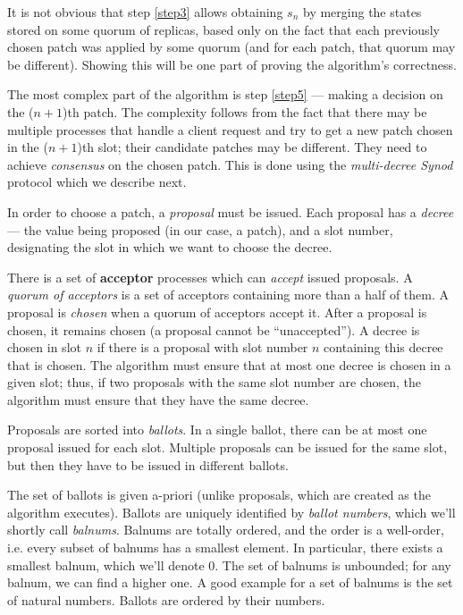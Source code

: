 \documentclass[12pt,a4paper,en]{pracamgr}
\newcommand{\tb}[1]{\textbf{#1}}
\newcommand{\ti}[1]{\textit{#1}}
\begin{document}
It is not obvious that step \ref{step3} allows obtaining $s_n$ by merging the states stored on some quorum of replicas, based only on the fact that each previously chosen patch was applied by some quorum (and for each patch, that quorum may be different). Showing this will be one part of proving the algorithm's correctness.

The most complex part of the algorithm is step \ref{step5} --- making a decision on the ($n+1$)th patch. The complexity follows from the fact that there may be multiple processes that handle a client request and try to get a new patch chosen in the ($n+1$)th slot; their candidate patches may be different. They need to achieve \ti{consensus} on the chosen patch. This is done using the \ti{multi-decree Synod} protocol which we describe next.

In order to choose a patch, a \ti{proposal} must be issued. Each proposal has a \ti{decree} --- the value being proposed (in our case, a patch), and a slot number, designating the slot in which we want to choose the decree.

There is a set of \tb{acceptor} processes which can \ti{accept} issued proposals. A \ti{quorum of acceptors} is a set of acceptors containing more than a half of them. A proposal is \ti{chosen} when a quorum of acceptors accept it. After a proposal is chosen, it remains chosen (a proposal cannot be ``unaccepted''). A decree is chosen in slot $n$ if there is a proposal with slot number $n$ containing this decree that is chosen. The algorithm must ensure that at most one decree is chosen in a given slot; thus, if two proposals with the same slot number are chosen, the algorithm must ensure that they have the same decree.

Proposals are sorted into \ti{ballots}. In a single ballot, there can be at most one proposal issued for each slot. Multiple proposals can be issued for the same slot, but then they have to be issued in different ballots.

The set of ballots is given a-priori (unlike proposals, which are created as the algorithm executes). Ballots are uniquely identified by \ti{ballot numbers}, which we'll shortly call \ti{balnums}. Balnums are totally ordered, and the order is a well-order, i.e. every subset of balnums has a smallest element. In particular, there exists a smallest balnum, which we'll denote $0$. The set of balnums is unbounded; for any balnum, we can find a higher one. A good example for a set of balnums is the set of natural numbers. Ballots are ordered by their numbers.
\end{document}
